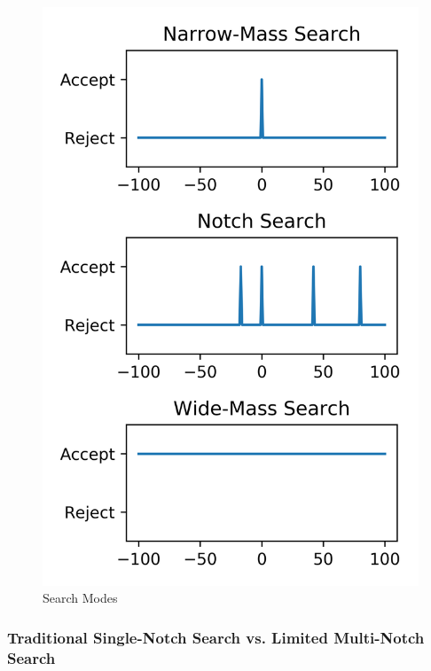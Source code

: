 \documentclass[journal=jprobs,manuscript=article]{achemso}
\begin{document}
\begin{figure}[H]
\includegraphics{fig3-searchTypes.png}
\caption{Search Modes}
\label{fig:fig3-searchTypes}
\end{figure}

\subsubsection{Traditional Single-Notch Search vs. Limited Multi-Notch Search}
\end{document}
